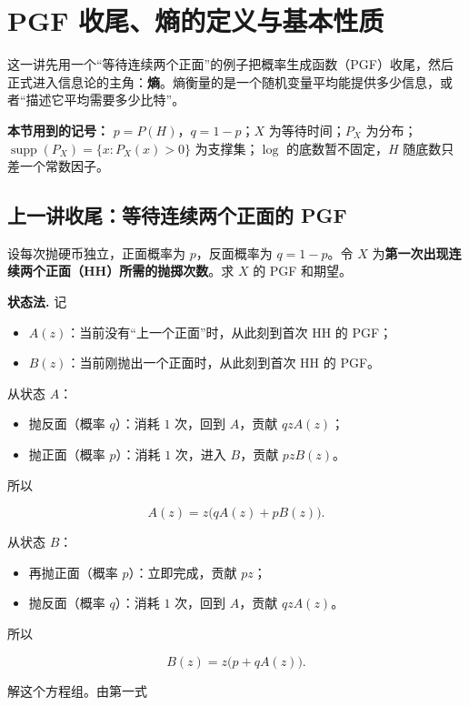 \section{PGF 收尾、熵的定义与基本性质}


这一讲先用一个“等待连续两个正面”的例子把概率生成函数（PGF）收尾，然后正式进入信息论的主角：\textbf{熵}。熵衡量的是一个随机变量平均能提供多少信息，或者“描述它平均需要多少比特”。

\textbf{本节用到的记号：} $p=P(H)$，$q=1-p$；$X$ 为等待时间；$P_X$ 为分布；$\operatorname{supp}(P_X)=\{x:P_X(x)>0\}$ 为支撑集；$\log$ 的底数暂不固定，$H$ 随底数只差一个常数因子。

\subsection{上一讲收尾：等待连续两个正面的 PGF}


设每次抛硬币独立，正面概率为 $p$，反面概率为 $q=1-p$。令 $X$ 为\textbf{第一次出现连续两个正面（HH）所需的抛掷次数}。求 $X$ 的 PGF 和期望。

\textbf{状态法.} 记

\begin{itemize}
\item $A(z)$：当前没有“上一个正面”时，从此刻到首次 HH 的 PGF；
\item $B(z)$：当前刚抛出一个正面时，从此刻到首次 HH 的 PGF。
\end{itemize}


从状态 $A$：

\begin{itemize}
\item 抛反面（概率 $q$）：消耗 $1$ 次，回到 $A$，贡献 $qzA(z)$；
\item 抛正面（概率 $p$）：消耗 $1$ 次，进入 $B$，贡献 $pzB(z)$。
\end{itemize}


所以

\[
A(z)=z\bigl(qA(z)+pB(z)\bigr).
\]

从状态 $B$：

\begin{itemize}
\item 再抛正面（概率 $p$）：立即完成，贡献 $pz$；
\item 抛反面（概率 $q$）：消耗 $1$ 次，回到 $A$，贡献 $qzA(z)$。
\end{itemize}


所以

\[
B(z)=z\bigl(p+qA(z)\bigr).
\]

解这个方程组。由第一式

